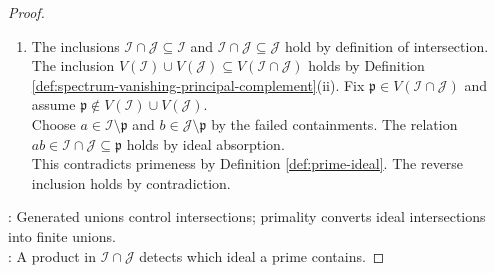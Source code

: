 \begin{proposition}
\begin{proof}
\begin{enumerate}[label=(\roman*)]
\item The inclusions $\mathcal{I}\cap\mathcal{J}\subseteq\mathcal{I}$ and $\mathcal{I}\cap\mathcal{J}\subseteq\mathcal{J}$ hold by definition of intersection.\\
The inclusion $V(\mathcal{I})\cup V(\mathcal{J})\subseteq V(\mathcal{I}\cap\mathcal{J})$ holds by Definition \ref{def:spectrum-vanishing-principal-complement}(ii). Fix $\mathfrak{p}\in V(\mathcal{I}\cap\mathcal{J})$ and assume $\mathfrak{p}\notin V(\mathcal{I})\cup V(\mathcal{J})$.\\
Choose $a\in\mathcal{I}\setminus\mathfrak{p}$ and $b\in\mathcal{J}\setminus\mathfrak{p}$ by the failed containments. The relation $ab\in\mathcal{I}\cap\mathcal{J}\subseteq\mathfrak{p}$ holds by ideal absorption.\\
This contradicts primeness by Definition \ref{def:prime-ideal}. The reverse inclusion holds by contradiction.
\end{enumerate}
: Generated unions control intersections; primality converts ideal intersections into finite unions.\\
: A product in $\mathcal{I}\cap\mathcal{J}$ detects which ideal a prime contains.
\end{proof}
\end{proposition}

